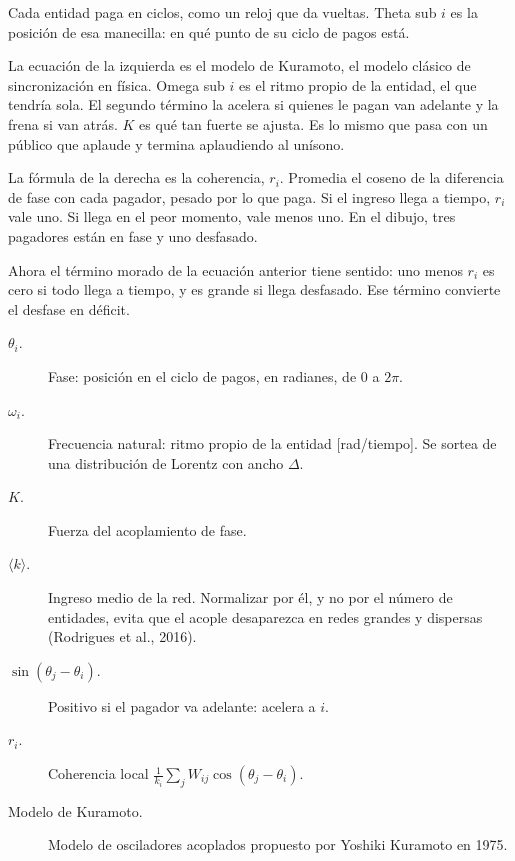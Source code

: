 \begin{decir}
Cada entidad paga en ciclos, como un reloj que da vueltas. Theta sub $i$ es la posición
de esa manecilla: en qué punto de su ciclo de pagos está.

La ecuación de la izquierda es el modelo de Kuramoto, el modelo clásico de
sincronización en física. Omega sub $i$ es el ritmo propio de la entidad, el que tendría
sola. El segundo término la acelera si quienes le pagan van adelante y la frena si van
atrás. $K$ es qué tan fuerte se ajusta. Es lo mismo que pasa con un público que aplaude
y termina aplaudiendo al unísono.

La fórmula de la derecha es la coherencia, $r_i$. Promedia el coseno de la diferencia de
fase con cada pagador, pesado por lo que paga. Si el ingreso llega a tiempo, $r_i$ vale
uno. Si llega en el peor momento, vale menos uno. En el dibujo, tres pagadores están en
fase y uno desfasado.

Ahora el término morado de la ecuación anterior tiene sentido: uno menos $r_i$ es cero
si todo llega a tiempo, y es grande si llega desfasado. Ese término convierte el desfase
en déficit.
\end{decir}
\begin{terminos}
\begin{description}
\item[$\theta_i$.] Fase: posición en el ciclo de pagos, en radianes, de $0$ a $2\pi$.
\item[$\omega_i$.] Frecuencia natural: ritmo propio de la entidad [rad/tiempo]. Se sortea
de una distribución de Lorentz con ancho $\Delta$.
\item[$K$.] Fuerza del acoplamiento de fase.
\item[$\langle k\rangle$.] Ingreso medio de la red. Normalizar por él, y no por el número
de entidades, evita que el acople desaparezca en redes grandes y dispersas (Rodrigues et
al., 2016).
\item[$\sin(\theta_j-\theta_i)$.] Positivo si el pagador va adelante: acelera a $i$.
\item[$r_i$.] Coherencia local $\frac1{k_i}\sum_jW_{ij}\cos(\theta_j-\theta_i)$.
\item[Modelo de Kuramoto.] Modelo de osciladores acoplados propuesto por Yoshiki
Kuramoto en 1975.
\end{description}
\end{terminos}

